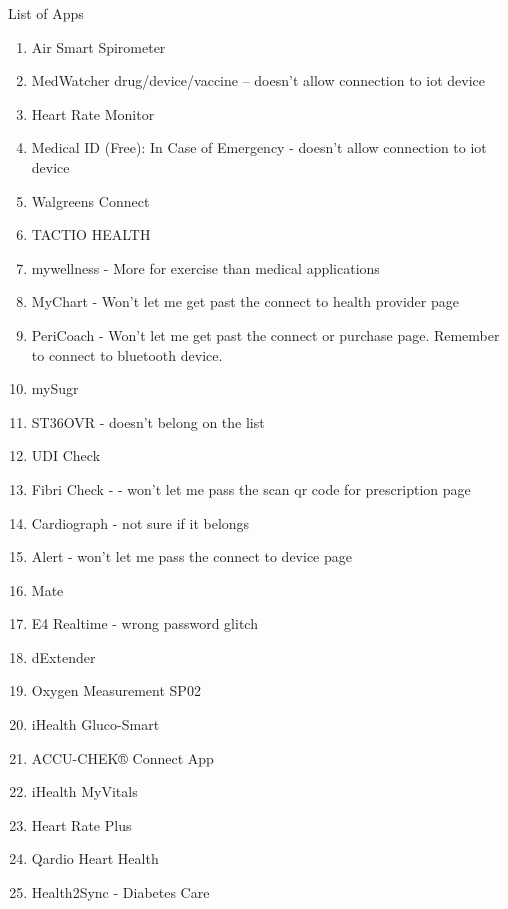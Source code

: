 \documentclass{article}
\begin{document}
\begin{center}
\LARGE List of Apps
\end{center}
\begin{enumerate}
\item Air Smart Spirometer
\item MedWatcher drug/device/vaccine -- doesn't allow connection to iot device
\item Heart Rate Monitor
\item Medical ID (Free): In Case of Emergency - doesn't allow connection to iot device
\item Walgreens Connect
\item TACTIO HEALTH
\item mywellness - More for exercise than medical applications
\item MyChart - Won't let me get past the connect to health provider page
\item PeriCoach - Won't let me get past the connect or purchase page. Remember to connect to bluetooth device.
\item mySugr 
\item ST36OVR - doesn't belong on the list
\item UDI Check 
\item Fibri Check - - won't let me pass the scan qr code for prescription page
\item Cardiograph - not sure if it belongs
\item Alert - won't let me pass the connect to device page
\item Mate
\item E4 Realtime - wrong password glitch
\item dExtender 
\item Oxygen Measurement SP02
\item iHealth Gluco-Smart
\item ACCU-CHEK® Connect App
\item iHealth MyVitals
\item Heart Rate Plus
\item Qardio Heart Health
\item Health2Sync - Diabetes Care

\end{enumerate}
\end{document}
